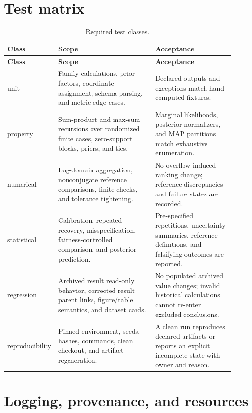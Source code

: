 \section{Test matrix}
\small
\begin{longtable}{@{}p{0.14\linewidth}p{0.43\linewidth}p{0.35\linewidth}@{}}
\caption{Required test classes.}\label{tab:handoff-tests}\\
\toprule
\textbf{Class} & \textbf{Scope} & \textbf{Acceptance}\\
\midrule
\endfirsthead
\toprule
\textbf{Class} & \textbf{Scope} & \textbf{Acceptance}\\
\midrule
\endhead
unit & Family calculations, prior factors, coordinate assignment, schema parsing, and metric edge cases. & Declared outputs and exceptions match hand-computed fixtures. \\
property & Sum-product and max-sum recursions over randomized finite cases, zero-support blocks, priors, and ties. & Marginal likelihoods, posterior normalizers, and MAP partitions match exhaustive enumeration. \\
numerical & Log-domain aggregation, nonconjugate reference comparisons, finite checks, and tolerance tightening. & No overflow-induced ranking change; reference discrepancies and failure states are recorded. \\
statistical & Calibration, repeated recovery, misspecification, fairness-controlled comparison, and posterior prediction. & Pre-specified repetitions, uncertainty summaries, reference definitions, and falsifying outcomes are reported. \\
regression & Archived result read-only behavior, corrected result parent links, figure/table semantics, and dataset cards. & No populated archived value changes; invalid historical calculations cannot re-enter excluded conclusions. \\
reproducibility & Pinned environment, seeds, hashes, commands, clean checkout, and artifact regeneration. & A clean run reproduces declared artifacts or reports an explicit incomplete state with owner and reason. \\
\bottomrule
\end{longtable}
\normalsize

\section{Logging, provenance, and resources}

